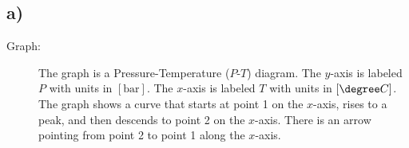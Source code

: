 

\subsection*{a)}
\begin{description}
    \item[Graph:] The graph is a Pressure-Temperature ($P$-$T$) diagram. The $y$-axis is labeled $P$ with units in $[\text{bar}]$. The $x$-axis is labeled $T$ with units in $[\degree C]$. The graph shows a curve that starts at point 1 on the $x$-axis, rises to a peak, and then descends to point 2 on the $x$-axis. There is an arrow pointing from point 2 to point 1 along the $x$-axis.
\end{description}